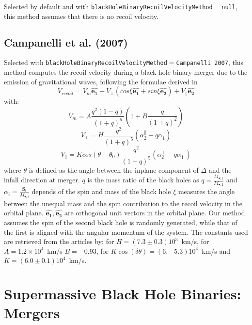 Selected by default and with {\tt blackHoleBinaryRecoilVelocityMethod}$=${\tt null}, this method assumes that there is no recoil velocity.

\subsection{Campanelli et al. (2007)}

Selected with {\tt blackHoleBinaryRecoilVelocityMethod}$=${\tt Campanelli 2007}, this method computes the recoil velocity during a black hole binary merger due to the emission of gravitational waves, following the formulae derived in \cite {campanelli_large_2007}
\begin{equation}
V_{recoil}=V_m\mathbf{\hat{e_1}}+V_\perp(cos\xi\mathbf{\hat{e_1}}+sin\xi\mathbf{\hat{e_2}})+V_\parallel\mathbf{\hat{e_2}} 
\end{equation}
with:
\begin{equation}
V_m=A\frac{q^2(1-q)}{(1+q)^5}(1+B\frac{q}{(1+q)^2})
\end{equation}
\begin{equation}
V_\perp=H\frac{q^2}{(1+q)^5}(\alpha^\parallel_2-q\alpha^\parallel_1)
\end{equation}
\begin{equation}
V_\parallel=Kcos(\theta-\theta_0)\frac{q^2}{(1+q)^5}(\alpha^\perp_2-q\alpha^\perp_1)
\end{equation}
where $\theta$ is defined as the angle between the inplane component of $\Delta$ and the infall direction at merger. $q$ is the mass ratio of the black holes as $q=\frac{M_{\bullet,1}}{M_{\bullet,2}}$ and $\alpha_i=\frac{\mathbf{S_i}}{M_{\bullet,i}}$ depends of the spin and mass of the black hole $\xi$ measures the angle between the unequal mass and the spin contribution to the recoil velocity in the orbital plane. $\mathbf{\hat{e_1}} , \mathbf{\hat{e_2}}$ are orthogonal unit vectors in the orbital plane. Our method assumes the spin of the second black hole is randomly generated, while that of the first is aligned with the angular momentum of the system. The constants used are retrieved from the articles by: \cite{koppitz_recoil_2007} for $H=(7.3\pm 0.3)10^3$~km/s, \cite{gonzalez_maximum_2007} for $A=1.2 \times 10^4$~km/s $B=-0.93$, \cite{gonzalez_supermassive_2007} for $K\cos(\delta\theta)=(6,-5.3)10^4$~km/s and $K=(6.0\pm 0.1)10^4$~km/s.

\section{Supermassive Black Hole Binaries: Mergers}

